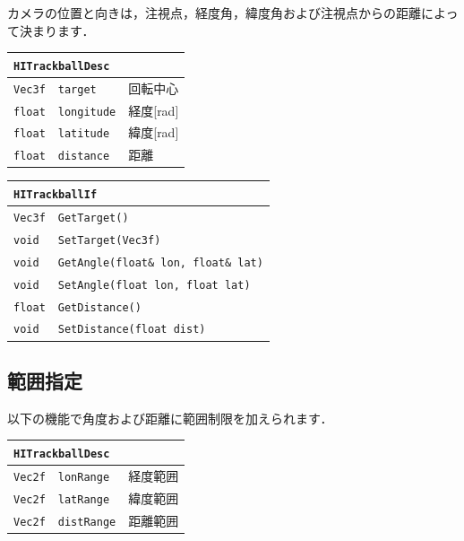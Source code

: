 \KLUDGE カメラの位置と向きは，注視点，経度角，緯度角および注視点からの距離によって決まります．

\begin{center}
\begin{tabular}{p{.15\hsize}p{.5\hsize}p{.25\hsize}}
\multicolumn{3}{l}{\texttt{HITrackballDesc}}				\\ \midrule
\texttt{Vec3f}	&	\texttt{target}			& \KLUDGE 回転中心		\\
\texttt{float}	&	\texttt{longitude}		& \KLUDGE 経度[rad]		\\
\texttt{float}	&	\texttt{latitude}		& \KLUDGE 緯度[rad]		\\
\texttt{float}	&	\texttt{distance}		& \KLUDGE 距離			\\
\end{tabular}
\end{center}

\begin{center}
\begin{tabular}{p{.15\hsize}p{.75\hsize}}
\multicolumn{2}{l}{\texttt{HITrackballIf}}									\\ \midrule
\texttt{Vec3f}	& \texttt{GetTarget()}							\\
\texttt{void} 	& \texttt{SetTarget(Vec3f)}						\\
\texttt{void} 	& \texttt{GetAngle(float\& lon, float\& lat)}	\\
\texttt{void} 	& \texttt{SetAngle(float lon, float lat)}		\\
\texttt{float} 	& \texttt{GetDistance()}						\\
\texttt{void} 	& \texttt{SetDistance(float dist)}				\\
\end{tabular}
\end{center}

\subsection*{\KLUDGE 範囲指定}

\KLUDGE 以下の機能で角度および距離に範囲制限を加えられます．

\begin{center}
\begin{tabular}{p{.15\hsize}p{.5\hsize}p{.25\hsize}}
\multicolumn{3}{l}{\texttt{HITrackballDesc}}					\\ \midrule
\texttt{Vec2f}	&	\texttt{lonRange}		& \KLUDGE 経度範囲			\\
\texttt{Vec2f}	&	\texttt{latRange}		& \KLUDGE 緯度範囲			\\
\texttt{Vec2f}	&	\texttt{distRange}		& \KLUDGE 距離範囲			\\
\end{tabular}
\end{center}

